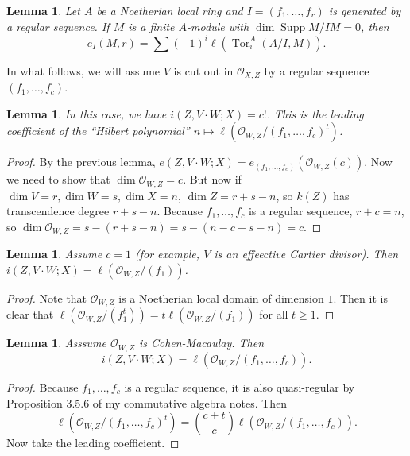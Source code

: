 \documentclass{amsart}
\newtheorem{lem}[thm]{Lemma}
\theoremstyle{definition}
\theoremstyle{remark}
\theoremstyle{plain}
\theoremstyle{definition}
\theoremstyle{remark}
\newcommand{\msc}[1]{\mathscr{#1}}
\DeclareMathOperator{\Tor}{Tor}
\DeclareMathOperator{\Supp}{Supp}
\begin{document}
\begin{lem}
    Let $A$ be a Noetherian local ring and $I = (f_1, \ldots, f_r)$ is generated by a regular sequence. If $M$ is a finite $A$-module with $\dim \Supp M/IM = 0$, then
    \[ e_I(M,r) = \sum {(-1)}^i \ell(\Tor_i^A(A/I, M)). \]
\end{lem}

In what follows, we will assume $V$ is cut out in $\msc{O}_{X,Z}$ by a regular sequence $(f_1, \ldots, f_c)$.
\begin{lem}
    In this case, we have $i(Z, V \cdot W; X) = c{!}$. This is the leading coefficient of the ``Hilbert polynomial'' $n \mapsto \ell(\msc{O}_{W,Z} / {(f_1, \ldots, f_c)}^t)$.
\end{lem}

\begin{proof}
    By the previous lemma, $e(Z, V \cdot W; X) = e_{(f_1, \ldots, f_c)}(\msc{O}_{W,Z}(c))$. Now we need to show that $\dim \msc{O}_{W,Z} = c$. But now if $\dim V = r, \dim W = s, \dim X = n$, $\dim Z = r+s-n$, so $k(Z)$ has transcendence degree $r+s-n$. Because $f_1, \ldots, f_c$ is a regular sequence, $r+c=n$, so $\dim \msc{O}_{W,Z} = s-(r+s-n) = s-(n-c+s-n)=c$.
\end{proof}

\begin{lem}
    Assume $c = 1$ (for example, $V$ is an effeective Cartier divisor). Then $i(Z, V \cdot W;X) = \ell(\msc{O}_{W,Z} / (f_1))$.
\end{lem}

\begin{proof}
    Note that $\msc{O}_{W,Z}$ is a Noetherian local domain of dimension $1$. Then it is clear that $\ell(\msc{O}_{W,Z}/(f_1^t)) = t \ell(\msc{O}_{W,Z} / (f_1))$ for all $t \geq 1$.
\end{proof}

\begin{lem}
    Asssume $\msc{O}_{W,Z}$ is Cohen-Macaulay. Then 
    \[ i(Z, V \cdot W; X) = \ell(\msc{O}_{W,Z} / (f_1, \ldots, f_c)). \]
\end{lem}

\begin{proof}
    Because $f_1, \ldots, f_c$ is a regular sequence, it is also quasi-regular by Proposition 3.5.6 of my commutative algebra notes. Then 
    \[ \ell(\msc{O}_{W,Z} / {(f_1, \ldots, f_c)}^t) = \binom{c+t}{c} \ell(\msc{O}_{W,Z} / (f_1, \ldots, f_c)). \]
    Now take the leading coefficient.
\end{proof}
\end{document}
